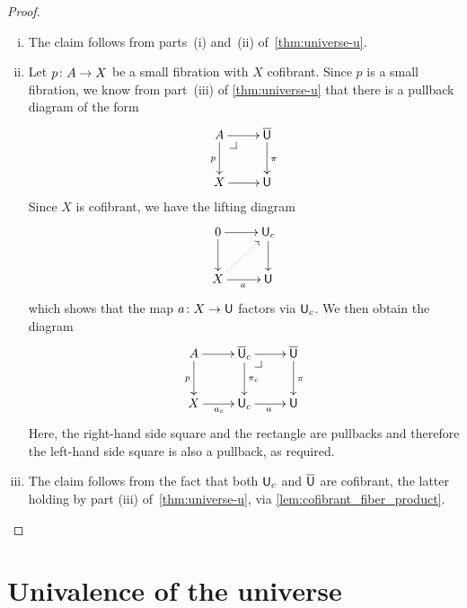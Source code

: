 \documentclass[reqno,10pt,a4paper,oneside,draft]{amsart}
\begin{document}
\begin{proof} \hfill
\begin{enumerate}[(i)] 
\item The claim follows from parts~(i) and~(ii) of~\cref{thm:universe-u}. 
\item Let $p \colon A \to X$ be a small fibration with $X$ cofibrant. Since $p$ is a
small fibration, we know 
from part~(iii) of \cref{thm:universe-u} that there is a pullback diagram of the form 
\[
\xymatrix{
A \ar[r] \ar[d]_p \drpullback & \UU \ar[d]^{\pi} \\
X \ar[r] & \U }
\]
Since $X$ is cofibrant, we have the lifting diagram
\[
\xymatrix{
0 \ar[r] \ar[d] & \U_c \ar[d]^{} \\
X \ar[r]_a \ar@{.>}[ur] & \U }
\]
which shows that the map $a \colon X \to \mathsf{U}$ factors via $\mathsf{U}_c$.  We then obtain the diagram
\[
\xymatrix{
A \ar[r] \ar[d]_p &  \UU_c \ar[r]  \ar[d]^{\pi_c} \drpullback & \UU \ar[d]^{\pi} \\
X \ar[r]_{a_c} & \U_c \ar[r]_{a} &  \U }
\]
Here, the right-hand side square and the rectangle are pullbacks and therefore the left-hand
side square is also a pullback, as required. 
\item The claim follows from the fact that both $\mathsf{U}_c$ and
$\overline{\mathsf{U}}$ are cofibrant, the latter holding by part (iii) of~\cref{thm:universe-u}, via \cref{lem:cofibrant_fiber_product}. \qedhere
\end{enumerate} 
\end{proof} 






\section{Univalence of the universe} 
\end{document}
